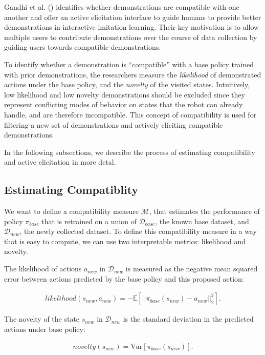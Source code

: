 \documentclass[
  letterpaper,
  numbers=noenddot,
  DIV=11,
  oneside]{scrreprt}
\theoremstyle{remark}
\begin{document}
Gandhi et al. ()
identifies whether demonstrations are compatible with one another and
offer an active elicitation interface to guide humans to provide better
demonstrations in interactive imitation learning. Their key motivation
is to allow multiple users to contribute demonstrations over the course
of data collection by guiding users towards compatible demonstrations.

To identify whether a demonstration is ``compatible'' with a base policy
trained with prior demonstrations, the researchers measure the
\emph{likelihood} of demonstrated actions under the base policy, and the
\emph{novelty} of the visited states. Intuitively, low likelihood and
low novelty demonstrations should be excluded since they represent
conflicting modes of behavior on states that the robot can already
handle, and are therefore incompatible. This concept of compatibility is
used for filtering a new set of demonstrations and actively eliciting
compatible demonstrations.

In the following subsections, we describe the process of estimating
compatibility and active elicitation in more detal.

\subsection{Estimating Compatiblity}\label{estimating-compatiblity}

We want to define a compatibility measure \(\mathcal{M}\), that
estimates the performance of policy \(\pi_{base}\) that is retrained on
a union of \(\mathcal{D}_{base}\), the known base dataset, and
\(\mathcal{D}_{new}\), the newly collected dataset. To define this
compatibility measure in a way that is easy to compute, we can use two
interpretable metrics: likelihood and novelty.

The likelihood of actions \(a_{new}\) in \(\mathcal{D}_{new}\) is
measured as the negative mean squared error between actions predicted by
the base policy and this proposed action:

\[\begin{aligned}
    likelihood(s_{new}, a_{new}) = -\mathbb{E}[|| \pi_{base}(s_{new}) - a_{new} ||^2_2].
\end{aligned}\]

The novelty of the state \(s_{new}\) in \(\mathcal{D}_{new}\) is the
standard deviation in the predicted actions under base policy:

\[\begin{aligned}
    novelty(s_{new}) = \mathrm{Var}[\pi_{base}(s_{new})].
\end{aligned}\]
\end{document}
